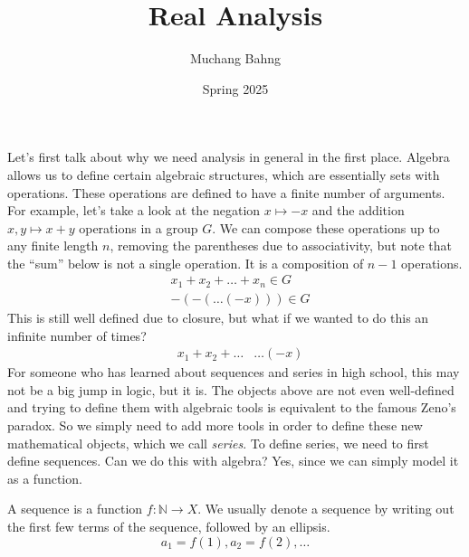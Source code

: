 \documentclass{article}
\begin{document}
\title{Real Analysis}
\author{Muchang Bahng}
\date{Spring 2025}

\maketitle
\tableofcontents
\pagebreak 

  Let's first talk about why we need analysis in general in the first place. Algebra allows us to define certain algebraic structures, which are essentially sets with operations. These operations are defined to have a finite number of arguments. For example, let's take a look at the negation $x \mapsto -x$ and the addition $x, y \mapsto x + y$ operations in a group $G$. We can compose these operations up to any finite length $n$, removing the parentheses due to associativity, but note that the ``sum'' below is not a single operation. It is a composition of $n-1$ operations. 
  \begin{align}
    & x_1 + x_2 + \ldots + x_n \in G  \\
    & -(-(\ldots(-x))) \in G
  \end{align} 
  This is still well defined due to closure, but what if we wanted to do this an infinite number of times? 
  \begin{align}
    & x_1 + x_2 + \ldots 
    & \ldots(-x)
  \end{align} 
  For someone who has learned about sequences and series in high school, this may not be a big jump in logic, but it is. The objects above are not even well-defined and trying to define them with algebraic tools is equivalent to the famous Zeno's paradox. So we simply need to add more tools in order to define these new mathematical objects, which we call \textit{series}. To define series, we need to first define sequences. Can we do this with algebra? Yes, since we can simply model it as a function. 

  \begin{definition}[Sequence]
    A sequence is a function $f: \mathbb{N} \rightarrow X$. We usually denote a sequence by writing out the first few terms of the sequence, followed by an ellipsis. 
    \begin{equation}
      a_1 = f(1), a_2 = f(2), \ldots
    \end{equation}
  \end{definition}
\end{document}
